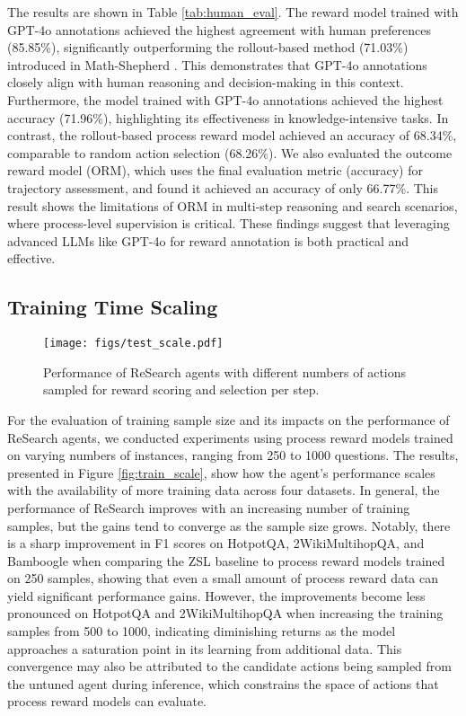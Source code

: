 

The results are shown in Table \ref{tab:human_eval}. The reward model trained with GPT-4o annotations achieved the highest agreement with human preferences (85.85\%), significantly outperforming the rollout-based method (71.03\%) introduced in Math-Shepherd \cite{wang2024math}. This demonstrates that GPT-4o annotations closely align with human reasoning and decision-making in this context. Furthermore, the model trained with GPT-4o annotations achieved the highest accuracy (71.96\%), highlighting its effectiveness in knowledge-intensive tasks. In contrast, the rollout-based process reward model achieved an accuracy of 68.34\%, comparable to random action selection (68.26\%). We also evaluated the outcome reward model (ORM), which uses the final evaluation metric (accuracy) for trajectory assessment, and found it achieved an accuracy of only 66.77\%. This result shows the limitations of ORM in multi-step reasoning and search scenarios, where process-level supervision is critical. These findings suggest that leveraging advanced LLMs like GPT-4o for reward annotation is both practical and effective.

\subsection{Training Time Scaling}

\begin{figure*}[h!] 
    \centering
    \texttt{[image: figs/test\_scale.pdf]}
    \caption{Performance of ReSearch agents with different numbers of actions sampled for reward scoring and selection per step.}
    \label{fig:test_scale}
\end{figure*}

For the evaluation of training sample size and its impacts on the performance of ReSearch agents, we conducted experiments using process reward models trained on varying numbers of instances, ranging from 250 to 1000 questions. The results, presented in Figure \ref{fig:train_scale}, show how the agent's performance scales with the availability of more training data across four datasets.
In general, the performance of ReSearch improves with an increasing number of training samples, but the gains tend to converge as the sample size grows. Notably, there is a sharp improvement in F1 scores on HotpotQA, 2WikiMultihopQA, and Bamboogle when comparing the ZSL baseline to process reward models trained on 250 samples, showing that even a small amount of process reward data can yield significant performance gains. However, the improvements become less pronounced on HotpotQA and 2WikiMultihopQA when increasing the training samples from 500 to 1000, indicating diminishing returns as the model approaches a saturation point in its learning from additional data. This convergence may also be attributed to the candidate actions being sampled from the untuned agent during inference, which constrains the space of actions that process reward models can evaluate.

